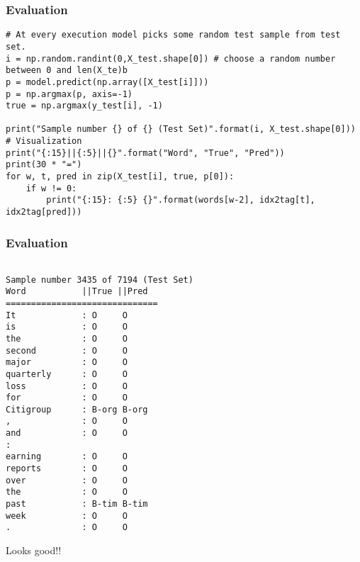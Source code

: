 \begin{frame}[fragile]\frametitle{Evaluation}

\begin{lstlisting}
# At every execution model picks some random test sample from test set.
i = np.random.randint(0,X_test.shape[0]) # choose a random number between 0 and len(X_te)b
p = model.predict(np.array([X_test[i]]))
p = np.argmax(p, axis=-1)
true = np.argmax(y_test[i], -1)

print("Sample number {} of {} (Test Set)".format(i, X_test.shape[0]))
# Visualization
print("{:15}||{:5}||{}".format("Word", "True", "Pred"))
print(30 * "=")
for w, t, pred in zip(X_test[i], true, p[0]):
    if w != 0:
        print("{:15}: {:5} {}".format(words[w-2], idx2tag[t], idx2tag[pred]))
\end{lstlisting}
\end{frame}

\begin{frame}[fragile]\frametitle{Evaluation}

\begin{lstlisting}

Sample number 3435 of 7194 (Test Set)
Word           ||True ||Pred
==============================
It             : O     O
is             : O     O
the            : O     O
second         : O     O
major          : O     O
quarterly      : O     O
loss           : O     O
for            : O     O
Citigroup      : B-org B-org
,              : O     O
and            : O     O
:
earning        : O     O
reports        : O     O
over           : O     O
the            : O     O
past           : B-tim B-tim
week           : O     O
.              : O     O
\end{lstlisting}

Looks good!!
\end{frame}

